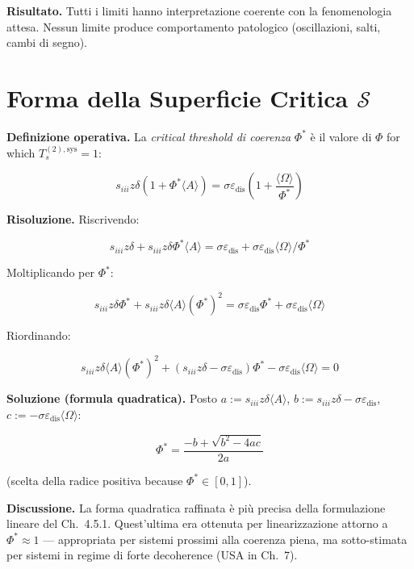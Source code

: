 \Proved{} \textbf{Risultato.} Tutti i limiti hanno interpretazione
coerente con la fenomenologia attesa. Nessun limite produce
comportamento patologico (oscillazioni, salti, cambi di segno).



\section{\texorpdfstring{Forma della Superficie Critica
\(\mathcal{S}\)}{Forma della Superficie Critica \textbackslash mathcal\{S\}}}\label{forma-della-superficie-critica-mathcals}

\Hypoth{} \textbf{Definizione operativa.} La \emph{critical threshold di
coerenza} \(\Phi^*\) è il valore di \(\Phi\) for which
\(T_s^{(2),\text{sys}} = 1\):

\[
s_{iii} z \delta (1 + \Phi^* \langle A\rangle) = \sigma \varepsilon_{\text{dis}} \left(1 + \frac{\langle\Omega\rangle}{\Phi^*}\right)
\]

\Proved{} \textbf{Risoluzione.} Riscrivendo:

\[
s_{iii} z \delta + s_{iii} z \delta \Phi^* \langle A\rangle = \sigma \varepsilon_{\text{dis}} + \sigma \varepsilon_{\text{dis}} \langle\Omega\rangle / \Phi^*
\]

Moltiplicando per \(\Phi^*\):

\[
s_{iii} z \delta \Phi^* + s_{iii} z \delta \langle A\rangle (\Phi^*)^2 = \sigma\varepsilon_{\text{dis}}\Phi^* + \sigma\varepsilon_{\text{dis}}\langle\Omega\rangle
\]

Riordinando:

\[
s_{iii} z \delta \langle A\rangle (\Phi^*)^2 + (s_{iii}z\delta - \sigma\varepsilon_{\text{dis}}) \Phi^* - \sigma\varepsilon_{\text{dis}}\langle\Omega\rangle = 0
\]

\Proved{} \textbf{Soluzione (formula quadratica).} Posto
\(a := s_{iii}z\delta\langle A\rangle\),
\(b := s_{iii}z\delta - \sigma\varepsilon_{\text{dis}}\),
\(c := -\sigma\varepsilon_{\text{dis}}\langle\Omega\rangle\):

\[
\boxed{\Phi^* = \frac{-b + \sqrt{b^2 - 4ac}}{2a}}
\]

(scelta della radice positiva because \(\Phi^* \in [0,1]\)).

\Hypoth{} \textbf{Discussione.} La forma quadratica raffinata è più
precisa della formulazione lineare del Ch.~4.5.1. Quest'ultima era
ottenuta per linearizzazione attorno a \(\Phi^* \approx 1\) ---
appropriata per sistemi prossimi alla coerenza piena, ma sotto-stimata
per sistemi in regime di forte decoherence (USA in Ch.~7).

